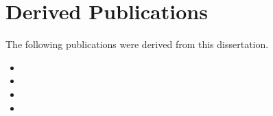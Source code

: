 \chapter{Derived Publications}
\label{app:derived_publications}

The following publications were derived from this dissertation.





\begin{itemize}
    \item {}

    \item \begingroup
          \endgroup

    \item \begingroup
          \endgroup

    \item \begingroup
          \endgroup
\end{itemize}

